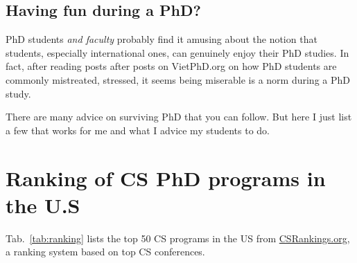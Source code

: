 \documentclass[11pt]{article}
\newcommand{\mycomment}[3][\color{blue}]{{#1{{#2}: {#3}}}}
\newcommand{\tvn}[1]{\mycomment{TVN}{#1}}{}
\begin{document}
\subsection{Having fun during a PhD?}
PhD students \emph{and faculty} probably find it amusing about the notion that students, especially international ones, can genuinely enjoy their PhD studies. In fact, after reading posts after posts on VietPhD.org on how PhD students are commonly mistreated, stressed, it seems being miserable is a norm during a PhD study.

There are many advice on surviving PhD that you can follow. But here I just list a few that works for me and what I advice my students to do.\tvn{TODO}


\section{Ranking of CS PhD programs in the U.S}\label{sec:ranking}
  Tab.~\ref{tab:ranking} lists the top 50 CS programs in the US from \href{https://www.csrankings.org}{CSRankings.org}, a ranking system  based on top CS conferences.
  
\end{document}
